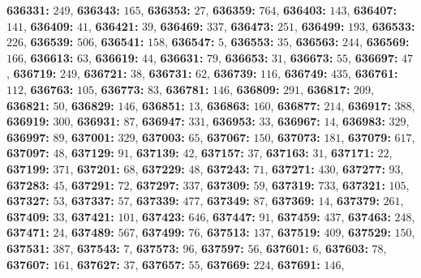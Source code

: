 \textsf{\bfseries 636331:} $249$, \textsf{\bfseries 636343:} $165$, \textsf{\bfseries 636353:} $27$, \textsf{\bfseries 636359:} $764$, \textsf{\bfseries 636403:} $143$, \textsf{\bfseries 636407:} $141$, \textsf{\bfseries 636409:} $41$, \textsf{\bfseries 636421:} $39$, \textsf{\bfseries 636469:} $337$, \textsf{\bfseries 636473:} $251$, \textsf{\bfseries 636499:} $193$, \textsf{\bfseries 636533:} $226$, \textsf{\bfseries 636539:} $506$, \textsf{\bfseries 636541:} $158$, \textsf{\bfseries 636547:} $5$, \textsf{\bfseries 636553:} $35$, \textsf{\bfseries 636563:} $244$, \textsf{\bfseries 636569:} $166$, \textsf{\bfseries 636613:} $63$, \textsf{\bfseries 636619:} $44$, \textsf{\bfseries 636631:} $79$, \textsf{\bfseries 636653:} $31$, \textsf{\bfseries 636673:} $55$, \textsf{\bfseries 636697:} $47$, \textsf{\bfseries 636719:} $249$, \textsf{\bfseries 636721:} $38$, \textsf{\bfseries 636731:} $62$, \textsf{\bfseries 636739:} $116$, \textsf{\bfseries 636749:} $435$, \textsf{\bfseries 636761:} $112$, \textsf{\bfseries 636763:} $105$, \textsf{\bfseries 636773:} $83$, \textsf{\bfseries 636781:} $146$, \textsf{\bfseries 636809:} $291$, \textsf{\bfseries 636817:} $209$, \textsf{\bfseries 636821:} $50$, \textsf{\bfseries 636829:} $146$, \textsf{\bfseries 636851:} $13$, \textsf{\bfseries 636863:} $160$, \textsf{\bfseries 636877:} $214$, \textsf{\bfseries 636917:} $388$, \textsf{\bfseries 636919:} $300$, \textsf{\bfseries 636931:} $87$, \textsf{\bfseries 636947:} $331$, \textsf{\bfseries 636953:} $33$, \textsf{\bfseries 636967:} $14$, \textsf{\bfseries 636983:} $329$, \textsf{\bfseries 636997:} $89$, \textsf{\bfseries 637001:} $329$, \textsf{\bfseries 637003:} $65$, \textsf{\bfseries 637067:} $150$, \textsf{\bfseries 637073:} $181$, \textsf{\bfseries 637079:} $617$, \textsf{\bfseries 637097:} $48$, \textsf{\bfseries 637129:} $91$, \textsf{\bfseries 637139:} $42$, \textsf{\bfseries 637157:} $37$, \textsf{\bfseries 637163:} $31$, \textsf{\bfseries 637171:} $22$, \textsf{\bfseries 637199:} $371$, \textsf{\bfseries 637201:} $68$, \textsf{\bfseries 637229:} $48$, \textsf{\bfseries 637243:} $71$, \textsf{\bfseries 637271:} $430$, \textsf{\bfseries 637277:} $93$, \textsf{\bfseries 637283:} $45$, \textsf{\bfseries 637291:} $72$, \textsf{\bfseries 637297:} $337$, \textsf{\bfseries 637309:} $59$, \textsf{\bfseries 637319:} $733$, \textsf{\bfseries 637321:} $105$, \textsf{\bfseries 637327:} $53$, \textsf{\bfseries 637337:} $57$, \textsf{\bfseries 637339:} $477$, \textsf{\bfseries 637349:} $87$, \textsf{\bfseries 637369:} $14$, \textsf{\bfseries 637379:} $261$, \textsf{\bfseries 637409:} $33$, \textsf{\bfseries 637421:} $101$, \textsf{\bfseries 637423:} $646$, \textsf{\bfseries 637447:} $91$, \textsf{\bfseries 637459:} $437$, \textsf{\bfseries 637463:} $248$, \textsf{\bfseries 637471:} $24$, \textsf{\bfseries 637489:} $567$, \textsf{\bfseries 637499:} $76$, \textsf{\bfseries 637513:} $137$, \textsf{\bfseries 637519:} $409$, \textsf{\bfseries 637529:} $150$, \textsf{\bfseries 637531:} $387$, \textsf{\bfseries 637543:} $7$, \textsf{\bfseries 637573:} $96$, \textsf{\bfseries 637597:} $56$, \textsf{\bfseries 637601:} $6$, \textsf{\bfseries 637603:} $78$, \textsf{\bfseries 637607:} $161$, \textsf{\bfseries 637627:} $37$, \textsf{\bfseries 637657:} $55$, \textsf{\bfseries 637669:} $224$, \textsf{\bfseries 637691:} $146$, 
